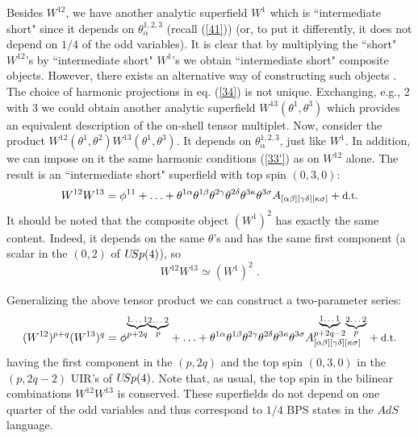 \documentclass[a4paper,12pt]{article}
\begin{document}
Besides $W^{12}$, we have another analytic superfield $W^1$ which 
is ``intermediate short" since it depends on 
$\theta^{1,2,3}_\alpha$ (recall (\ref{41})) (or, to put it 
differently, it does not depend on $1/4$ of the odd variables). It 
is clear that by multiplying the ``short" $W^{12}$'s by 
``intermediate short" $W^1$'s we obtain ``intermediate short" 
composite objects. However, there exists an alternative way of 
constructing such objects \cite{AFSZ,FS}. The choice of harmonic 
projections in eq. (\ref{34}) is not unique. Exchanging, e.g., 2 
with 3 we could obtain another analytic superfield 
$W^{13}(\theta^1,\theta^3)$ which provides an equivalent 
description of the on-shell tensor multiplet. Now, consider the 
product $W^{12}(\theta^1,\theta^2)W^{13}(\theta^1,\theta^3)$. It 
depends on $\theta^{1,2,3}_\alpha$, just like $W^1$. In addition, 
we can impose on it the same harmonic conditions (\ref{33'}) as on 
$W^{12}$ alone. The result is an ``intermediate short" superfield 
with top spin $(0,3,0)$: 
\begin{equation}\label{new}
  W^{12}W^{13} = \phi^{11} + \ldots + \theta^{1\alpha}\theta^{1\beta}
\theta^{2\gamma}\theta^{2\delta} 
\theta^{3\kappa}\theta^{3\sigma}  
A_{[\alpha\beta][\gamma\delta][\kappa\sigma]} + \mbox{\small d.t.} 
\end{equation}
It should be noted that the composite object $(W^1)^2$ has exactly 
the same content. Indeed, it depends on the same $\theta$'s and 
has the same first component (a scalar in the $(0,2)$ of 
$U\hskip-2pt Sp(4)$), so
\begin{equation}\label{equi}
  W^{12}W^{13} \simeq (W^1)^2\; .
\end{equation}


Generalizing the above tensor product we can construct a 
two-parameter series: 
\begin{equation}\label{60}
  (W^{12})^{p+q}(W^{13})^{q}  = \phi^{\stackrel{\underbrace{\mbox{\scriptsize 
1\ldots 1}}}{p+2q} \stackrel{\underbrace{\mbox{\scriptsize 2\ldots 
2}}}{p}} + \ldots +  
\theta^{1\alpha}\theta^{1\beta}\theta^{2\gamma}\theta^{2\delta} 
\theta^{3\kappa}\theta^{3\sigma}  
A^{\stackrel{\underbrace{\mbox{\scriptsize 1\ldots 1}}}{p+2q-2} 
\stackrel{\underbrace{\mbox{\scriptsize 2\ldots 
2}}}{p}}_{[\alpha\beta][\gamma\delta][\kappa\sigma]} + 
\mbox{\small d.t.} 
\end{equation}
having the first component in the $(p,2q)$ and the top spin 
$(0,3,0)$ in the $(p,2q-2)$ UIR's of $U\hskip-2pt Sp(4)$. Note 
that, as usual, the top spin in the bilinear combinations 
$W^{12}W^{13}$ is conserved. These superfields do not depend on 
one quarter of the odd variables and thus correspond to $1/4$ BPS 
states in the $AdS$ language. 
\end{document}
